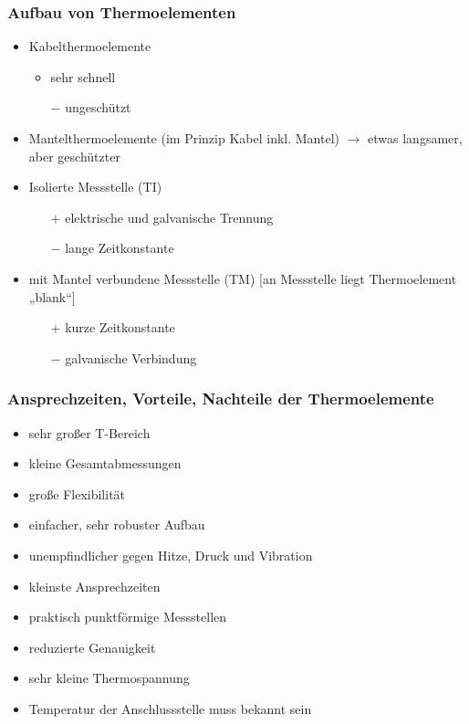 \documentclass{scrreprt}
\begin{document}
\subsubsection{Aufbau von Thermoelementen}
\begin{itemize}
\item Kabelthermoelemente
\begin{itemize}[label=$+$]
\item sehr schnell
\item[$-$] ungeschützt
\end{itemize}
\item Mantelthermoelemente (im Prinzip Kabel inkl. Mantel) $\to$ etwas langsamer, aber geschützter
\item Isolierte Messstelle (TI)
\begin{itemize}
\item[$+$] elektrische und galvanische Trennung
\item[$-$] lange Zeitkonstante
\end{itemize}
\item mit Mantel verbundene Messstelle (TM) [an Messstelle liegt Thermoelement „blank“]
\begin{itemize}
\item[$+$] kurze Zeitkonstante
\item[$-$] galvanische Verbindung
\end{itemize}
\end{itemize}
\subsubsection{Ansprechzeiten, Vorteile, Nachteile der Thermoelemente}
\begin{itemize}[label=$+$]
\item sehr großer T-Bereich
\item kleine Gesamtabmessungen
\item große Flexibilität
\item einfacher, sehr robuster Aufbau
\item unempfindlicher gegen Hitze, Druck und Vibration
\item kleinste Ansprechzeiten
\item praktisch punktförmige Messstellen
\end{itemize}
\begin{itemize}[label=$-$]
\item reduzierte Genauigkeit
\item sehr kleine Thermospannung
\item Temperatur der Anschlussstelle muss bekannt sein
\end{itemize}
\end{document}
